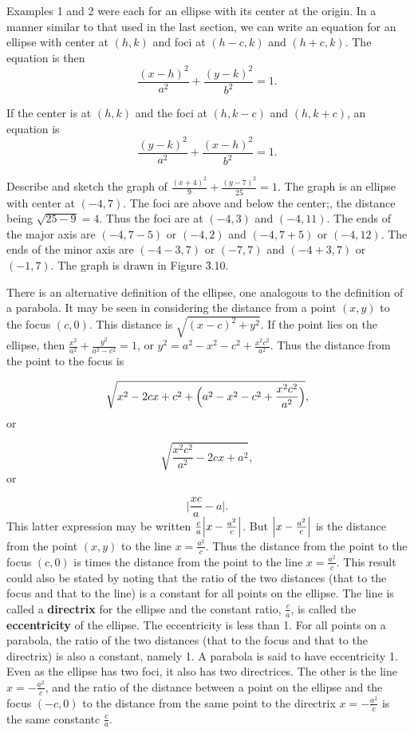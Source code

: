 
Examples 1 and 2 were each for an ellipse with its center at the origin. In a manner similar to that used in the last section, we can write an equation for an ellipse with center at $(h, k)$ and foci at $(h - c, k)$ and $(h + c, k)$. The equation is then
$$
\frac{(x-h)^2}{a^2} + \frac{(y-k)^2}{b^2} = 1.
$$

If the center is at $(h, k)$ and the foci at $(h, k - c)$ and $(h, k + c)$, an equation is
$$
\frac{(y-k)^2}{a^2} + \frac{(x - h)^2}{b^2} = 1 .
$$
\medskip
\begin{example}
Describe and sketch the graph of $\frac{(x + 4)^2}{9} + \frac{(y - 7)^2}{25} = 1$. The graph is an ellipse with center at $(-4, 7)$. The foci are above and below
the center;, the distance being $\sqrt{25 - 9} = 4$. Thus the foci are at $(-4, 3)$ and $(-4, 11)$. The ends of the major axis are $(-4, 7 - 5)$ or $(-4, 2)$ and $(-4, 7 + 5)$ or $(-4, 12)$. The ends of the minor axis are $(-4 - 3, 7)$ or $(-7, 7)$ and $(-4 + 3, 7)$ or $(-1, 7)$. The graph is drawn in Figure \f{3.10}.


There is an alternative definition of the ellipse, one analogous to the definition of a parabola. It may be seen in considering the distance from a point $(x, y)$ to the focus $(c, 0)$. This distance is $\sqrt{(x - c)^2 + y^2}$. If the point lies on the ellipse, then $\frac{x^2}{a^2} + \frac{y^2}{a^2 - c^2} = 1$, or $y^2 = a^2 - x^2 - c^2 + \frac{x^2 c^2}{a^2}$. Thus the distance from the point to the focus is

$$
\sqrt{x^2 -2cx + c^2 + \Bigl(a^2 - x^2 - c^2 + \frac{x^2c^2}{a^2} \Bigr)},
$$
\noindent or

$$
\sqrt{\frac{x^2 c^2 }{a^2} - 2cx + a^2},
$$
\noindent or

$$
\Big| \frac{xc}{a} - a \Big|.
$$
\noindent This latter expression may be written $\frac{c}{a} \Bigl|x - \frac{a^2}{c} \Bigr|$.  But $\Bigl| x - \frac{a^2}{c} \Bigr|$ is the distance from the point $(x, y)$ to the line $x = \frac{a^2}{c}$. Thus the distance from the
point to the focus $(c, 0)$ is times the distance from the point to the line $x = \frac{a^2}{c}$. This result could also be stated by noting that the ratio of the two distances (that to the focus and that to the line) is a constant for all points on the ellipse. The line is called a \textbf{directrix} for the ellipse and the constant ratio, $\frac{c}{a}$, is called the \textbf{eccentricity} of the ellipse. The eccentricity is less than 1. For all points on a parabola, the ratio of the two distances (that to the focus and that to the directrix) is also a constant, namely 1. A parabola is said to have eccentricity 1. Even as the ellipse has two foci, it also has two directrices. The other is the line $x = -\frac{a^2}{c}$, and the ratio of the distance between a point on the ellipse and the focus $(-c, 0)$ to the distance from the same point to the directrix $x = -\frac{a^2}{c}$ is the same constantc $\frac{c}{a}$.


\end{example}
